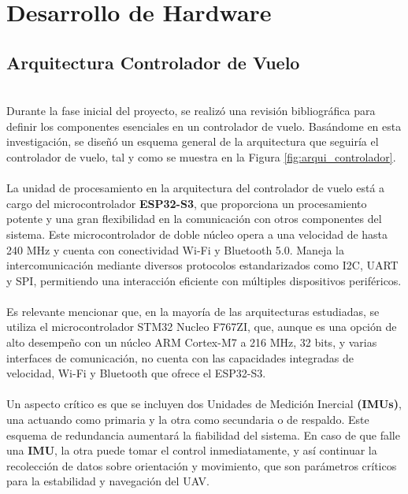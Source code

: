 
\section{Desarrollo de Hardware}
\subsection{Arquitectura Controlador de Vuelo}
\\
Durante la fase inicial del proyecto, se realizó una revisión bibliográfica para definir los componentes esenciales en un controlador de vuelo. Basándome en esta investigación, se diseñó un esquema general de la arquitectura que seguiría el controlador de vuelo, tal y como se muestra en la Figura \ref{fig:arqui_controlador}.\\ \\

La unidad de procesamiento en la arquitectura del controlador de vuelo está a cargo del microcontrolador \textbf{ESP32-S3}, que proporciona un procesamiento potente y una gran flexibilidad en la comunicación con otros componentes del sistema. Este microcontrolador de doble núcleo opera a una velocidad de hasta 240 MHz y cuenta con conectividad Wi-Fi y Bluetooth 5.0. Maneja la intercomunicación mediante diversos protocolos estandarizados como I2C, UART y SPI, permitiendo una interacción eficiente con múltiples dispositivos periféricos.\\ \\

Es relevante mencionar que, en la mayoría de las arquitecturas estudiadas, se utiliza el microcontrolador STM32 Nucleo F767ZI, que, aunque es una opción de alto desempeño con un núcleo ARM Cortex-M7 a 216 MHz, 32 bits, y varias interfaces de comunicación, no cuenta con las capacidades integradas de velocidad, Wi-Fi y Bluetooth que ofrece el ESP32-S3.\\ \\



Un aspecto crítico es que se incluyen dos Unidades de Medición Inercial \textbf{(IMUs)}, una actuando como primaria y la otra como secundaria o de respaldo. Este esquema de redundancia aumentará la fiabilidad del sistema. En caso de que falle una \textbf{IMU}, la otra puede tomar el control inmediatamente, y así continuar la recolección de datos sobre orientación y movimiento, que son parámetros críticos para la estabilidad y navegación del UAV.
\vspace{5 px}

